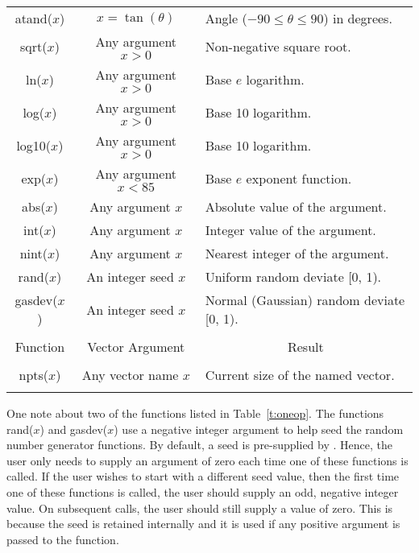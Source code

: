 \begin{table}
\begin{tabular}{|c|c|l|}
    atand($x$)     & $x = \tan(\theta)$
           & Angle ($-90 \leq \theta \leq 90$) in degrees. \\
    sqrt($x$)      & Any argument $x > 0$  & Non-negative square root.\\
    ln($x$)        & Any argument $x > 0$  & Base $e$ logarithm.      \\
    log($x$)       & Any argument $x > 0$  & Base 10 logarithm.       \\
    log10($x$)     & Any argument $x > 0$  & Base 10 logarithm.       \\
    exp($x$)       & Any argument $x < 85$ & Base $e$ exponent function.     \\
    abs($x$)       & Any argument $x$      & Absolute value of the argument. \\
    int($x$)       & Any argument $x$      & Integer value of the argument.  \\
    nint($x$)      & Any argument $x$      & Nearest integer of the argument.\\
    rand($x$)      & An integer seed $x$   & Uniform random deviate [0, 1). \\
    gasdev($x$)    & An integer seed $x$
           & Normal (Gaussian) random deviate [0, 1). \\
    && \\ \hline\hline
    \multicolumn{1}{|c}{Function} & \multicolumn{1}{|c}{Vector Argument}
      & \multicolumn{1}{|c|}{Result} \\ \hline
    && \\
    npts($x$)      & Any vector name $x$   & Current size of the named vector.\\
    && \\ \hline\hline
  \end{tabular}
\end{table}

One note about two of the functions listed in Table~\ref{t:oneop}.
The functions rand($x$) and gasdev($x$) use a negative integer argument
to help seed the random number generator functions.
By default, a seed is pre-supplied by \wip.
Hence, the user only needs to supply an argument of zero each time one
of these functions is called.
If the user wishes to start with a different seed value, then
the first time one of these functions is called, the user should
supply an odd, negative integer value.
On subsequent calls, the user should still supply a value of zero.
This is because the seed is retained internally and it is used if any
positive argument is passed to the function.

